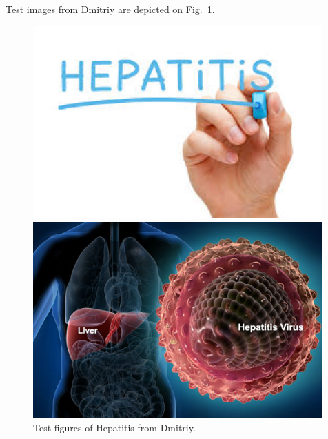 \documentclass[10pt, paper=a4]{article}
\begin{document}
Test images from Dmitriy are depicted on Fig.~\ref{fig:test}.
\begin{figure}
  \begin{minipage}{0.49\textwidth}
    \includegraphics[width = 0.99\textwidth]{download.jpg}
  \end{minipage} \hfill
  \begin{minipage}{0.49\textwidth}
    \includegraphics[width = 0.99\textwidth]{webmd_rf_photo_of_liver_and_hepatitis_virus.jpg}
  \end{minipage} \vfill
  \caption{Test figures of Hepatitis from Dmitriy.}
  \label{fig:test}
\end{figure}
\end{document}

